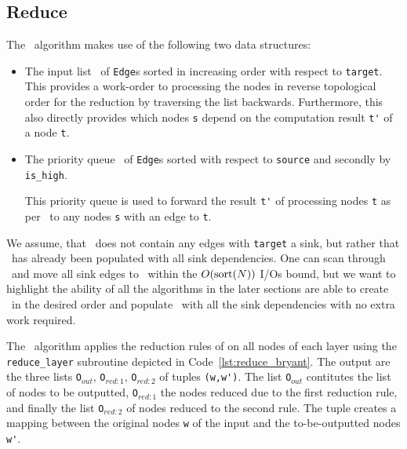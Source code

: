 \subsection{Reduce} \label{sec:theory__reduce}
The \Reduce\ algorithm makes use of the following two data structures:

\begin{itemize}
\item The input list \ReduceLforward\ of \lstinline{Edge}s sorted in increasing
  order with respect to \lstinline{target}. This provides a work-order to
  processing the nodes in reverse topological order for the reduction by
  traversing the list backwards. Furthermore, this also directly provides which
  nodes \lstinline{s} depend on the computation result \lstinline{t'} of a node
  \lstinline{t}.

\item The priority queue \ReduceQdep\ of \lstinline{Edge}s sorted with
  respect to \lstinline{source} and secondly by \lstinline{is_high}.

  This priority queue is used to forward the result \lstinline{t'} of processing
  nodes \lstinline{t} as per \ReduceLforward\ to any nodes \lstinline{s} with an
  edge to \lstinline{t}.
\end{itemize}
We assume, that \ReduceLforward\ does not contain any edges with
\lstinline{target} a sink, but rather that \ReduceQdep\ has already been
populated with all sink dependencies. One can scan through \ReduceLforward\ and
move all sink edges to \ReduceQdep\ within the $O(\text{sort}(N))$ I/Os bound, but we
want to highlight the ability of all the algorithms in the later sections are
able to create \ReduceLforward\ in the desired order and populate \ReduceQdep\
with all the sink dependencies with no extra work required.

The \Reduce\ algorithm applies the reduction rules of \textcite[Definition
5]{Bryant86} on all nodes of each layer using the \lstinline{reduce_layer}
subroutine depicted in Code~\ref{lst:reduce_bryant}. The output are the three
lists \lstinline{O}$_{\mathit{out}}$, \lstinline{O}$_{\mathit{red:}1}$,
\lstinline{O}$_{\mathit{red:}2}$ of tuples \lstinline{(w,w')}. The list
\lstinline{O}$_{\mathit{out}}$ contitutes the list of nodes to be outputted,
\lstinline{O}$_{\mathit{red:}1}$ the nodes reduced due to the first reduction
rule, and finally the list \lstinline{O}$_{\mathit{red:}2}$ of nodes reduced to
the second rule. The tuple creates a mapping between the original nodes
\lstinline{w} of the input and the to-be-outputted nodes \lstinline{w'}.

